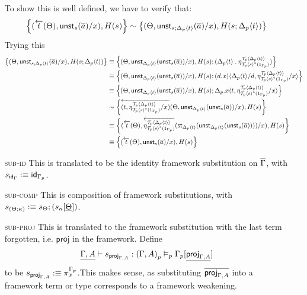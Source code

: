 \documentclass[10pt]{article}
\theoremstyle{definition}
\newcommand{\yields}{\vdash}
\newcommand{\rewrite}[2]{\overleftarrow{#1}(#2)}
\newcommand\StI[2]{\ensuremath{\mathsf{st}_{#1}(#2)}}
\newcommand\UnSt[2]{\ensuremath{\mathsf{unst}_{#1}(#2)}}
\newcommand\TrCirc[2]{\ensuremath{{#1}^\circ(#2)}}
\newcommand\proj[1]{\ensuremath{\mathsf{proj}_{#1}}}
\newcommand{\id}{\mathsf{id}}
\newcommand\ApEl[2]{\mathcal{T}_{#1}\langle#2\rangle}
\newcommand\ap[2]{\ensuremath{#1 \langle #2 \rangle }}
\newcommand\bdot[0]{\mathbin{.}}
\begin{document}
\begin{enumerate}
To show this is well defined, we have to verify that:
\begin{align*}
\left\{ (\rewrite{t}{\Theta}, \UnSt{s}{\upstairs{a}}/x), H(s) \right\} \sim \left\{ (\Theta, \UnSt{s;\ap{\asdep{\Delta}}{t}}{\upstairs{a}}/x), H(s;\ap{\asdep{\Delta}}{t}) \right\} 
\end{align*}
Trying this
\begin{align*}
\left\{ (\Theta, \UnSt{s;\ap{\asdep{\Delta}}{t}}{\upstairs{a}}/x), H(s;\ap{\asdep{\Delta}}{t}) \right\} 
&\equiv \left\{ (\Theta, \UnSt{\ap{\asdep{\Delta}}{t}}{\UnSt{s}{\upstairs{a}}}/x), H(s) ; (\ap{\asdep{\Delta}}{t} \bdot \eta^{\ApEl{p}{\ap{\asdep{\Delta}}{t}}}_{\TrCirc{\ApEl{p}{s}}{1_{\asdep{\Gamma}}}})\right\} \\
&\equiv \left\{ (\Theta, \UnSt{\ap{\asdep{\Delta}}{t}}{\UnSt{s}{\upstairs{a}}}/x), H(s) ; \ap{(d.x)}{\ap{\asdep{\Delta}}{t}/d, \eta^{\ApEl{p}{\ap{\asdep{\Delta}}{t}}}_{\TrCirc{\ApEl{p}{s}}{1_{\asdep{\Gamma}}}}/x} \right\} \\
&\equiv \left\{ (\Theta, \UnSt{\ap{\asdep{\Delta}}{t}}{\UnSt{s}{\upstairs{a}}}/x), H(s) ; \ap{\asdep{\Delta}.x}{t,\eta^{\ApEl{p}{\ap{\asdep{\Delta}}{t}}}_{\TrCirc{\ApEl{p}{s}}{1_{\asdep{\Gamma}}}}/x} \right\} \\
&\sim \left\{ \rewrite{(t,\eta^{\ApEl{p}{\ap{\asdep{\Delta}}{t}}}_{\TrCirc{\ApEl{p}{s}}{1_{\asdep{\Gamma}}}}/x)}{\Theta, \UnSt{\ap{\asdep{\Delta}}{t}}{\UnSt{s}{\upstairs{a}}}/x}, H(s) \right\} \\
&\equiv \left\{ (\rewrite{t}{\Theta}, \rewrite{\eta^{\ApEl{p}{\ap{\asdep{\Delta}}{t}}}_{\TrCirc{\ApEl{p}{s}}{1_{\asdep{\Gamma}}}}}{\StI{\ap{\asdep{\Delta}}{t}}{\UnSt{\ap{\asdep{\Delta}}{t}}{\UnSt{s}{\upstairs{a}}}}}/x), H(s) \right\} \\
&\equiv \left\{ (\rewrite{t}{\Theta}, \UnSt{s}{\upstairs{a}}/x), H(s) \right\}
\end{align*}
\item[\textsc{sub-id}] This is translated to be the identity framework substitution on $\overline{\Gamma}$, with $s_{\id_\Gamma} :\equiv \id_{\asdep{\Gamma}}$.

\item[\textsc{sub-comp}] This is composition of framework substitutions, with $s_{(\Theta;\kappa)} :\equiv s_\Theta; (s_\kappa[\underline{\Theta}])$.

\item[\textsc{sub-proj}] This is translated to the framework substitution with the last term forgotten, i.e. $\mathsf{proj}$ in the framework. Define 
\begin{align*}
\downstairs{\Gamma, A} \yields s_{\proj{\Gamma, A}} : \asdep{(\Gamma, A)} \vDash_p \asdep{\Gamma}[\downstairs{\proj{\Gamma, A}}]
\end{align*}
to be $s_{\proj{\Gamma, A}} :\equiv \pi^{\asdep{\Gamma}}_x$.This makes sense, as substituting $\upstairs{\proj{\Gamma, A}}$ into a framework term or type corresponds to a framework weakening.


\end{enumerate}
\end{document}
